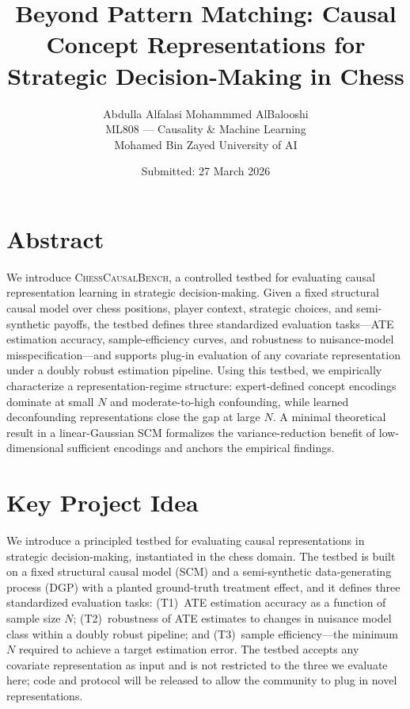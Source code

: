 \documentclass[11pt]{article}
\title{
\vspace{-2.5em}
\textbf{Beyond Pattern Matching: Causal Concept Representations for Strategic Decision-Making in Chess}
\vspace{-1em}
}
\author{
Abdulla Alfalasi \quad Mohammmed AlBalooshi \\
\small ML808 --- Causality \& Machine Learning \\
\small Mohamed Bin Zayed University of AI
}
\date{Submitted: 27 March 2026}
\begin{document}
\maketitle
\vspace{-2.5em}

\section*{Abstract}

We introduce \textsc{ChessCausalBench}, a controlled testbed for evaluating causal
representation learning in strategic decision-making. Given a fixed structural causal
model over chess positions, player context, strategic choices, and semi-synthetic
payoffs, the testbed defines three standardized evaluation tasks---ATE estimation
accuracy, sample-efficiency curves, and robustness to nuisance-model
misspecification---and supports plug-in evaluation of any covariate representation
under a doubly robust estimation pipeline. Using this testbed, we empirically
characterize a representation-regime structure: expert-defined concept encodings
dominate at small $N$ and moderate-to-high confounding, while learned deconfounding
representations close the gap at large $N$. A minimal theoretical result in a
linear-Gaussian SCM formalizes the variance-reduction benefit of low-dimensional
sufficient encodings and anchors the empirical findings.

\section*{Key Project Idea}

We introduce a principled testbed for evaluating causal representations in
strategic decision-making, instantiated in the chess domain. The testbed is built
on a fixed structural causal model (SCM) and a semi-synthetic data-generating
process (DGP) with a planted ground-truth treatment effect, and it defines three
standardized evaluation tasks: (T1)~ATE estimation accuracy as a function of sample
size $N$; (T2)~robustness of ATE estimates to changes in nuisance model class within
a doubly robust pipeline; and (T3)~sample efficiency---the minimum $N$ required to
achieve a target estimation error. The testbed accepts any covariate representation
as input and is not restricted to the three we evaluate here; code and protocol will
be released to allow the community to plug in novel representations.\cite{scholkopf2021towards,pearl2009causality}
\end{document}
